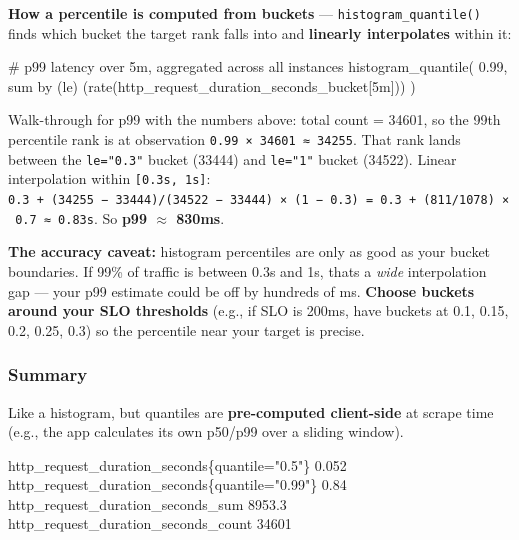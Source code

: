 \documentclass[11pt]{article}
\newenvironment{Shaded}{\begin{snugshade}}{\end{snugshade}}
\newcommand{\DecValTok}[1]{\textcolor[rgb]{0.96,0.45,0.00}{#1}}
\newcommand{\FloatTok}[1]{\textcolor[rgb]{0.96,0.45,0.00}{#1}}
\newcommand{\NormalTok}[1]{\textcolor[rgb]{0.81,0.81,0.76}{#1}}
\newcommand{\OperatorTok}[1]{\textcolor[rgb]{0.81,0.81,0.76}{#1}}
\newcommand{\StringTok}[1]{\textcolor[rgb]{0.96,0.31,0.31}{#1}}
\begin{document}
\textbf{How a percentile is computed from buckets} --- \texttt{histogram\_quantile()} finds which bucket the target rank falls into and \textbf{linearly interpolates} within it:


\begin{Shaded}
\begin{Highlighting}[]
\NormalTok{\# p99 latency over 5m, aggregated across all instances}
\NormalTok{histogram\_quantile(}
\NormalTok{  0.99,}
\NormalTok{  sum by (le) (rate(http\_request\_duration\_seconds\_bucket[5m]))}
\NormalTok{)}
\end{Highlighting}
\end{Shaded}

Walk-through for p99 with the numbers above: total count = 34601, so the 99th percentile rank is at observation \texttt{0.99\ ×\ 34601\ ≈\ 34255}. That rank lands between the \texttt{le="0.3"} bucket (33444) and \texttt{le="1"} bucket (34522). Linear interpolation within \texttt{{[}0.3s,\ 1s{]}}: \texttt{0.3\ +\ (34255\ −\ 33444)/(34522\ −\ 33444)\ ×\ (1\ −\ 0.3)\ =\ 0.3\ +\ (811/1078)\ ×\ 0.7\ ≈\ 0.83s}. So \textbf{p99 \(\approx\) 830ms}.

\textbf{The accuracy caveat:} histogram percentiles are only as good as your bucket boundaries. If 99\% of traffic is between 0.3s and 1s, that\textquotesingle s a \emph{wide} interpolation gap --- your p99 estimate could be off by hundreds of ms. \textbf{Choose buckets around your SLO thresholds} (e.g., if SLO is 200ms, have buckets at 0.1, 0.15, 0.2, 0.25, 0.3) so the percentile near your target is precise.

\subsubsection{Summary}\label{summary}

Like a histogram, but quantiles are \textbf{pre-computed client-side} at scrape time (e.g., the app calculates its own p50/p99 over a sliding window).


\begin{Shaded}
\begin{Highlighting}[]
\NormalTok{http\_request\_duration\_seconds\{quantile}\OperatorTok{=}\StringTok{"0.5"}\NormalTok{\}   }\FloatTok{0.052}
\NormalTok{http\_request\_duration\_seconds\{quantile}\OperatorTok{=}\StringTok{"0.99"}\NormalTok{\}  }\FloatTok{0.84}
\NormalTok{http\_request\_duration\_seconds\_sum                }\FloatTok{8953.3}
\NormalTok{http\_request\_duration\_seconds\_count              }\DecValTok{34601}
\end{Highlighting}
\end{Shaded}
\end{document}
